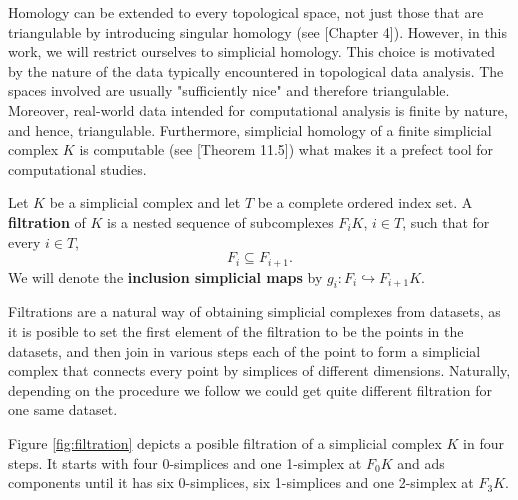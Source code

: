 Homology can be extended to every topological space, not just those that are triangulable by introducing singular homology (see \cite{munkres}[Chapter 4]). However, in this work, we will restrict ourselves to simplicial homology. This choice is motivated by the nature of the data typically encountered in topological data analysis. The spaces involved are usually "sufficiently nice" and therefore triangulable. Moreover, real-world data intended for computational analysis is finite by nature, and hence, triangulable. Furthermore, simplicial homology of a finite simplicial complex $K$ is computable (see \cite{munkres}[Theorem 11.5]) what makes it a prefect tool for computational studies.

\begin{definition}[Filtration]
    Let $ K $ be a simplicial complex and let $ T $ be a complete ordered index set. A {\bf filtration} of $ K $ is a nested sequence of subcomplexes $ F_i K $, $ i \in T $, such that for every $ i \in T $, 
    \begin{equation}
        F_i \subseteq F_{i+1}.
    \end{equation}
    We will denote the {\bf inclusion simplicial maps} by $ g_i \colon F_i \hookrightarrow F_{i+1} K $.
\end{definition}

Filtrations are a natural way of obtaining simplicial complexes from datasets, as it is posible to set the first element of the filtration to be the points in the datasets, and then join in various steps each of the point to form a simplicial complex that connects every point by simplices of different dimensions. Naturally, depending on the procedure we follow we could get quite different filtration for one same dataset.

\begin{example} \label{ex:filtration}
    Figure \ref{fig:filtration} depicts a posible filtration of a simplicial complex $K$ in four steps. It starts with four 0-simplices and one 1-simplex at $ F_0 K $ and ads components until it has six $0$-simplices, six 1-simplices and one 2-simplex at $ F_3 K $.
    
\end{example}

